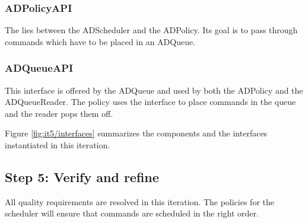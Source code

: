 \subsubsection{ADPolicyAPI}

\npar The  lies between the ADScheduler and the ADPolicy.
Its goal is to pass through commands which have to be placed in an ADQueue.

\subsubsection{ADQueueAPI}

\npar This interface is offered by the ADQueue and used by both the ADPolicy and
the ADQueueReader. The policy uses the interface to place commands in the queue
and the reader pops them off.

\npar Figure \ref{fig:it5/interfaces} summarizes the components and the
interfaces instantiated in this iteration.

\subsection{Step 5: Verify and refine}
\label{add:it5/verification}

\npar All quality requirements are resolved in this iteration. The policies for
the scheduler will ensure that commands are scheduled in the right order. 
